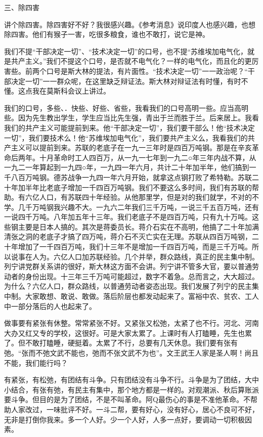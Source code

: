 三、除四害

讲个除四害。除四害好不好？我很感兴趣。《参考消息》说印度人也感兴趣，也想除四害。他们有猴子一害，吃很多粮食，谁也不敢打，说它是神。

我们不提“干部决定一切”、“技术决定一切”的口号，也不提“苏维埃加电气化，就是共产主义。”我们不提这个口号，是否就不电气化？一样的电气化，而且化的更厉害些。前两个口号是斯大林的提法，有片面性。“技术决定一切”一一政治呢？“干部决定一切”一一群众呢，在这里缺乏辩证法。斯大林对辩证法有时懂，有时不懂。这点我在莫斯科会议上讲过。

我们的口号，多些、．快些、好些、省些，我看我们的口号高明一些。应当高明些。因为先生教出学生，学生应当比先生强，青出于兰而胜于兰。后来居上。我看我们的共产主义可能提前到来。他“干部决定一切”，我们要干部么！他“技术决定一切”，我们要技术么！他“苏维埃加电气化”，我们要共产主义么，我看我们的共产主义可以提前到来。苏联的老底子在一九一三年时是四百万吨钢。那是在辛亥革命后两年。十月革命时工人四百万，从一九一七年到一九二○年三年内战不算，从一九二一年算起到一九四○年，一九四一年六月，共计二十年加半年，他们搞到一千八百万吨钢。德苏战争一九四一年六月开始，就拿这点钢打败了希特勒。苏联二十年加半年比老底子增加一千四百万吨钢。我们不要这么多时间，我们有苏联的帮助。有六亿人口，有苏联四十年经验。从他那里学，但是对的我们就学，不对的不学。几千万吨钢我兴趣不大。一九六二年我们三千万吨，一说三千五百万吨，还有一说四千万吨。八年加五年十三年。我们老底子不是四百万吨，只有九十万吨。这些钢主要是日本人搞的。其次是蒋委员长。蒋介石实在不高明，他搞了二十年加满清张之洞的老底子才搞了四万吨，蒋介石不灭亡实在无理。苏联从四百万吨钢，二十年增加了一千四百万吨，我们十三年不是增加一千四百万吨，而是三千万吨。所以说事在人为。六亿人口加苏联经验。几个并举，群众路线，真正的民主集中制。列宁讲党群关系讲的很好，斯大林这方面不会讲。列宁讲不管多大官，要以普通劳动者的身份出现。十三年三千万吨可能超过，数字不着急。总而言之，大大超过。为什么？六亿人口，群众路线，以普通劳动者姿态出现。我们发展了列宁的民主集中制。大家敢想、敢说、敢做。落后阶层也都发动起来了。富裕中农、贫农、工人中一部分落后的人也起来了。

做事要有紧张有休整。常常紧张不好。又紧张又松弛，太紧了也不行。河北、河南大办又红又专的学校，这很好。可是大家太累了。上课时有人打瞌睡，先生也累了。但不敢打瞌睡，硬挺着。太累了不行，总要有几天休息。我们要有张有弛。“张而不弛文武不能也，弛而不张文武不为也”。文王武王人家是圣人啊！尚且不能，我们能行吗？

有紧张，有松弛，有团结有斗争。只有团结没有斗争不行。斗争是为了团结，大中小结合，有张有弛，有民主有集中，那个地方都是一样的。对观潮派、秋后算账派要斗争。但目的是为了团结，不是不叫革命。阿Q最伤心的事是不准他革命。不帮助人家改过，一味批评不好。一斗二帮，要有好心，没有好心，居心不良可不好，无非是打倒你我来。多一个人好。少一个人好，人多一点好，要调动一切积极因素。

